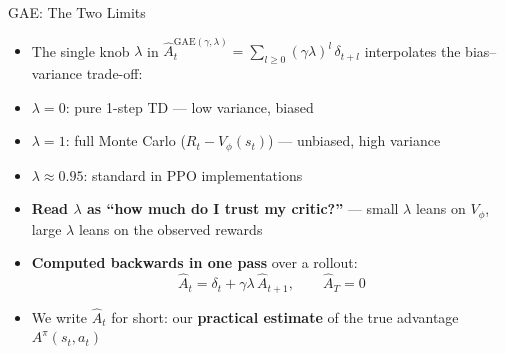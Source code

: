\begin{frame}{GAE: The Two Limits}
\begin{itemize}
    \item The single knob $\lambda$ in $\hat{A}^{\mathrm{GAE}(\gamma,\lambda)}_t = \sum_{l \geq 0} (\gamma\lambda)^l\, \delta_{t+l}$ interpolates the bias--variance trade-off:
    \item $\lambda = 0$: pure 1-step TD --- low variance, biased
    \item $\lambda = 1$: full Monte Carlo ($R_t - V_\phi(s_t)$) --- unbiased, high variance
    \item $\lambda \approx 0.95$: standard in PPO implementations
    \item \textbf{Read $\lambda$ as ``how much do I trust my critic?''} --- small $\lambda$ leans on $V_\phi$, large $\lambda$ leans on the observed rewards
    \pause
    \item \textbf{Computed backwards in one pass} over a rollout:
    $$\hat{A}_t = \delta_t + \gamma\lambda\, \hat{A}_{t+1}, \qquad \hat{A}_T = 0$$
    \item We write $\hat{A}_t$ for short: our \textbf{practical estimate} of the true advantage $A^{\pi}(s_t,a_t)$
\end{itemize}
\end{frame}
